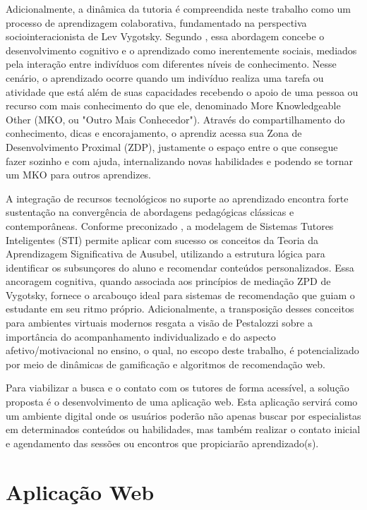 Adicionalmente, a dinâmica da tutoria é compreendida neste trabalho como um processo de aprendizagem colaborativa, fundamentado na perspectiva sociointeracionista de Lev Vygotsky. Segundo , essa abordagem concebe o desenvolvimento cognitivo e o aprendizado como inerentemente sociais, mediados pela interação entre indivíduos com diferentes níveis de conhecimento. Nesse cenário, o aprendizado ocorre quando um indivíduo realiza uma tarefa ou atividade que está além de suas capacidades recebendo o apoio de uma pessoa ou recurso com mais conhecimento do que ele, denominado More Knowledgeable Other (MKO, ou "Outro Mais Conhecedor"). Através do compartilhamento do conhecimento, dicas e encorajamento, o aprendiz acessa sua Zona de Desenvolvimento Proximal (ZDP), justamente o espaço entre o que consegue fazer sozinho e com ajuda, internalizando novas habilidades e podendo se tornar um MKO para outros aprendizes.

A integração de recursos tecnológicos no suporte ao aprendizado encontra forte sustentação na convergência de abordagens pedagógicas clássicas e contemporâneas. Conforme preconizado , a modelagem de Sistemas Tutores Inteligentes (STI) permite aplicar com sucesso os conceitos da Teoria da Aprendizagem Significativa de Ausubel, utilizando a estrutura lógica para identificar os subsunçores do aluno e recomendar conteúdos personalizados. Essa ancoragem cognitiva, quando associada aos princípios de mediação ZPD de Vygotsky, fornece o arcabouço ideal para sistemas de recomendação que guiam o estudante em seu ritmo próprio. Adicionalmente, a transposição desses conceitos para ambientes virtuais modernos resgata a visão de Pestalozzi sobre a importância do acompanhamento individualizado e do aspecto afetivo/motivacional no ensino, o qual, no escopo deste trabalho, é potencializado por meio de dinâmicas de gamificação e algoritmos de recomendação web.

Para viabilizar a busca e o contato com os tutores de forma acessível, a solução proposta é o desenvolvimento de uma aplicação web. Esta aplicação servirá como um ambiente digital onde os usuários poderão não apenas buscar por especialistas em determinados conteúdos ou habilidades, mas também realizar o contato inicial e agendamento das sessões ou encontros que propiciarão aprendizado(s).

\section[Aplicação Web]{Aplicação Web}
\label{sec:aw}

